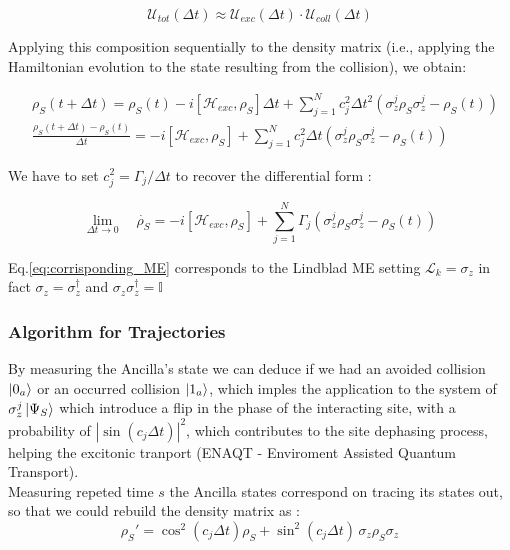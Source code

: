 \documentclass[a4paper,12pt]{article}
\begin{document}
	\begin{equation}
		\mathcal{U}_{tot}(\Delta t) \approx \mathcal{U}_{exc}(\Delta t) \cdot \mathcal{U}_{coll}(\Delta t)
		\label{eq:trotter_suzuki}
	\end{equation}

	Applying this composition sequentially to the density matrix (i.e., applying the Hamiltonian evolution to the state resulting from the collision), we obtain:

	\begin{align}
		&\rho_S \left(t + \Delta t\right) = \rho_S (t) - i \left[\mathcal{H}_{exc}, \rho_S \right]\Delta t + \sum_{j=1}^{N}{c_{j}^{2} \Delta t ^{2} \left( \sigma_{z}^{j} \rho_S \sigma_{z}^{j} - \rho_S (t) \right)} \\
		&\frac{\rho_S \left(t + \Delta t\right) - \rho_S (t)}{\Delta t} = - i \left[\mathcal{H}_{exc}, \rho_S \right] + \sum_{j=1}^{N}{c_{j}^{2} \Delta t \left( \sigma_{z}^{j} \rho_S \sigma_{z}^{j} - \rho_S (t) \right)}
		\label{eq_incremental_ratio}
	\end{align}

	We have to set $ c_{j}^{2} = \Gamma_j / \Delta t  $ to recover the differential form :

	\begin{equation}
		\lim\limits_{\Delta t \rightarrow 0} \quad \dot{\rho_S} = - i \left[\mathcal{H}_{exc}, \rho_S \right] + \sum_{j=1}^{N}{\Gamma_{j} \left( \sigma_{z}^{j} \rho_S \sigma_{z}^{j} - \rho_S (t) \right)}
		\label{eq:corrisponding_ME}
	\end{equation}

	Eq.\ref{eq:corrisponding_ME} corresponds to the Lindblad ME setting $ \mathcal{L}_k = \sigma_{z} $ in fact $ \sigma_{z} = \sigma_{z}^{\dagger} $ and $ \sigma_{z} \sigma_{z}^{\dagger} = \mathbb{I} $

	\subsubsection{Algorithm for Trajectories}
	\label{sub:alg_for_traj_QJ}

	By measuring the Ancilla's state we can deduce if we had an avoided collision $ \ket{0_a} $ or an occurred collision $ \ket{1_a} $, which imples the application to the system of $ \sigma_{z}^{j} \ket{\Psi_S} $ which introduce a flip in the phase of the interacting site, with a probability of $ \left| {\sin \left(c_j \Delta t \right)} \right|^2  $, which contributes to the site dephasing process, helping the excitonic tranport (ENAQT - Enviroment Assisted Quantum Transport). \\
	Measuring repeted time $ s $ the Ancilla states correspond on tracing its states out, so that we could rebuild the density matrix as :
	\begin{equation}
		\rho_S' = \cos^{2}{\left(c_{j} \Delta t\right)} \rho_S + \sin^{2}{\left(c_{j} \Delta t\right)} \, \sigma_{z} \rho_S \sigma_{z}
	\end{equation}
\end{document}
